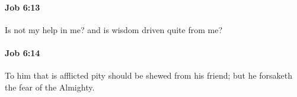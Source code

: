 		\paragraph{Job 6:13} %
			\label{JOB-6-13}

			Is not my help in me? and is wisdom driven quite from me?


		\paragraph{Job 6:14} %
			\label{JOB-6-14}

			To him that is afflicted pity should be shewed from his friend; but he forsaketh the fear of the Almighty.



